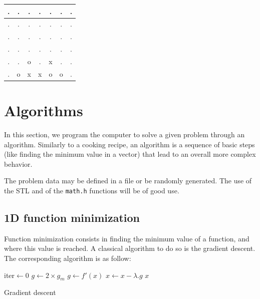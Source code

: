 \documentclass{ecnreport}
\begin{document}
\begin{center}
 \begin{tabular}{|c|c|c|c|c|c|c|}
 \hline  
 . &.&.&.&. &.&.\\\hline
 . &.&.&.&. &.&.\\\hline
 . &.&.&.&. &.&.\\\hline
 . &.&.&.&. &.&.\\\hline
 . &.&o&.&x &.&.\\\hline
 . &o&x&x&o &o&.\\\hline
 \end{tabular}
\end{center}
\begin{itemize}
\end{itemize}

\newpage

\section{Algorithms}

In this section, we program the computer to solve a given problem through an algorithm. Similarly to a cooking recipe, an algorithm is a sequence of basic steps (like finding the minimum value in a vector) that lead to an overall more complex behavior.

The problem data may be defined in a file or be randomly generated.
The use of the STL and of the \texttt{math.h} functions will be of good use. 

\subsection{1D function minimization}

Function minimization consists in finding the minimum value of a function, and where this value is reached. A classical algorithm to do so is the gradient descent. The corresponding algorithm is as follow:

\begin{algorithm}[!h]
{}
iter$\gets$0\;
$g\gets2\times g_m$\;
{
$g\gets f'(x)$\;
$x\gets x - \lambda.g$\;
}
\Return $x$\;
\caption{Gradient descent}
\label{algo:grad}
\end{algorithm}
\end{document}
